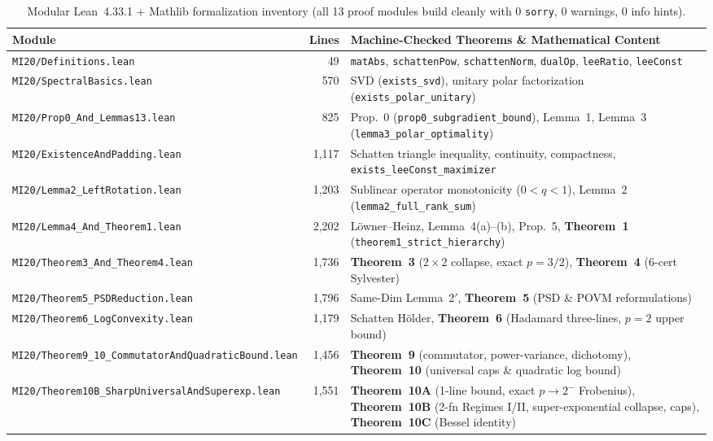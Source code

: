 \documentclass[10pt,letterpaper]{article}
\begin{document}
\begin{table}[htbp]
\centering
\caption{\small Modular Lean~4.33.1 + Mathlib formalization inventory (all 13 proof modules build cleanly with 0 \texttt{sorry}, 0 warnings, 0 info hints).}
\vspace{3pt}
\footnotesize
\setlength{\tabcolsep}{4.5pt}
\begin{tabular}{@{}l r >{\raggedright\arraybackslash}p{8.4cm}@{}}
\toprule
\textbf{Module} & \textbf{Lines} & \textbf{Machine-Checked Theorems \& Mathematical Content} \\
\midrule
\texttt{MI20/Definitions.lean}           &    49 & \texttt{matAbs}, \texttt{schattenPow}, \texttt{schattenNorm}, \texttt{dualOp}, \texttt{leeRatio}, \texttt{leeConst} \\
\texttt{MI20/SpectralBasics.lean}        &   570 & SVD (\texttt{exists\_svd}), unitary polar factorization (\texttt{exists\_polar\_unitary}) \\
\texttt{MI20/Prop0\_And\_Lemmas13.lean}  &   825 & Prop.~0 (\texttt{prop0\_subgradient\_bound}), Lemma~1, Lemma~3 (\texttt{lemma3\_polar\_optimality}) \\
\texttt{MI20/ExistenceAndPadding.lean}   & 1,117 & Schatten triangle inequality, continuity, compactness, \texttt{exists\_leeConst\_maximizer} \\
\texttt{MI20/Lemma2\_LeftRotation.lean}  & 1,203 & Sublinear operator monotonicity ($0<q<1$), Lemma~2 (\texttt{lemma2\_full\_rank\_sum}) \\
\texttt{MI20/Lemma4\_And\_Theorem1.lean} & 2,202 & L\"owner--Heinz, Lemma~4(a)--(b), Prop.~5, \textbf{Theorem~1} (\texttt{theorem1\_strict\_hierarchy}) \\
\texttt{MI20/Theorem3\_And\_Theorem4.lean}& 1,736 & \textbf{Theorem~3} ($2\times 2$ collapse, exact $p=3/2$), \textbf{Theorem~4} (6-cert Sylvester) \\
\texttt{MI20/Theorem5\_PSDReduction.lean}& 1,796 & Same-Dim Lemma~2$'$, \textbf{Theorem~5} (PSD \& POVM reformulations) \\
\texttt{MI20/Theorem6\_LogConvexity.lean}& 1,179 & Schatten H\"older, \textbf{Theorem~6} (Hadamard three-lines, $p=2$ upper bound) \\
\texttt{MI20/Theorem9\_10\_CommutatorAnd\allowbreak QuadraticBound.lean} & 1,456 & \textbf{Theorem~9} (commutator, power-variance, dichotomy), \textbf{Theorem~10} (universal caps \& quadratic log bound) \\
\texttt{MI20/Theorem10B\_SharpUniversal\allowbreak AndSuperexp.lean} & 1,551 & \textbf{Theorem~10A} (1-line bound, exact $p\to 2^-$ Frobenius), \textbf{Theorem~10B} (2-fn Regimes I/II, super-exponential collapse, caps), \textbf{Theorem~10C} (Bessel identity) \\

\end{tabular}
\end{table}
\end{document}
